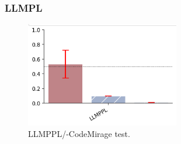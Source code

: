\subsubsection{LLMPL}
\begin{figure}[H]
    \centering
    \includegraphics[width=0.6\textwidth]{img/LLMPPL/AIG.png}
    \caption{LLMPPL/-CodeMirage test.}
    \label{fig:LLMPPL-CodeMirage test}
\end{figure}

